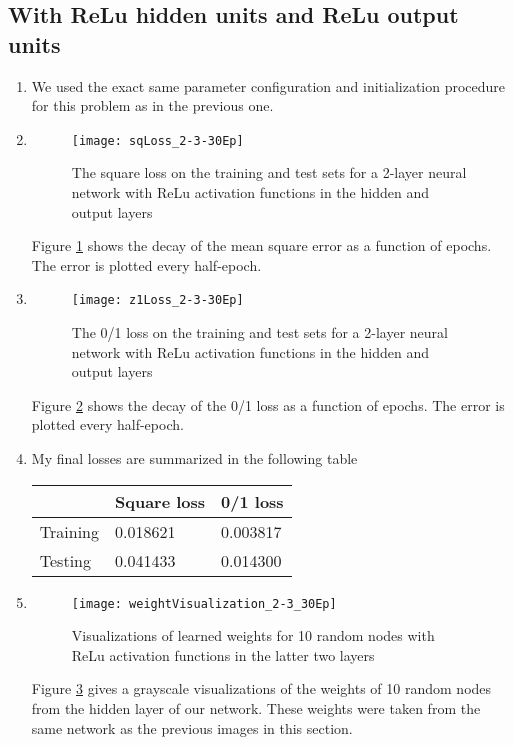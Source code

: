 \documentclass{article}
\begin{document}

\subsection{With ReLu hidden units and ReLu output units}

    \begin{enumerate}
    \item We used the exact same parameter configuration and initialization procedure for this problem as in the previous one.
    \item
    \begin{figure}
        \centering
        \texttt{[image: sqLoss\_2-3-30Ep]}
        \caption{The square loss on the training and test sets for a 2-layer neural network with ReLu activation functions in the hidden and output layers} 
        \label{fig:sqLoss_2-2}
    \end{figure}
    Figure \ref{fig:sqLoss_2-2} shows the decay of the mean square error as a function of epochs. The error is plotted every half-epoch.
    \item
    \begin{figure}
        \centering
        \texttt{[image: z1Loss\_2-3-30Ep]}
        \caption{The 0/1 loss on the training and test sets for a 2-layer neural network with ReLu activation functions in the hidden and output layers} 
        \label{fig:z1Loss_2-3}
    \end{figure}
    Figure \ref{fig:z1Loss_2-3} shows the decay of the 0/1 loss as a function of epochs. The error is plotted every half-epoch.
    \item My final losses are summarized in the following table

    \begin{tabular}{l|ll}
    & Square loss & 0/1 loss \\
    \hline
    Training & 0.018621  & 0.003817 \\
    Testing  & 0.041433  & 0.014300
    \end{tabular}

    \item 
    \begin{figure}
        \centering
        \texttt{[image: weightVisualization\_2-3\_30Ep]}
        \caption{Visualizations of learned weights for 10 random nodes with ReLu activation functions in the latter two layers} 
        \label{fig:weights2-3}
    \end{figure}
    Figure \ref{fig:weights2-3} gives a grayscale visualizations of the weights of 10 random nodes from the hidden layer of our network. These weights were taken from the same network as the previous images in this section.
\end{enumerate}
\end{document}
